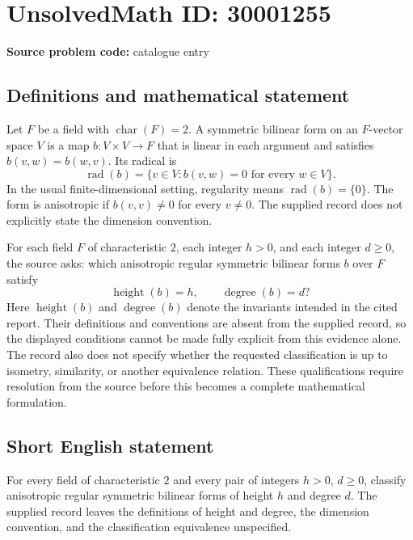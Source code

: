 \documentclass[11pt]{article}
\begin{document}
\section*{UnsolvedMath ID: 30001255}
\textbf{Source problem code:} catalogue entry
\subsection{Definitions and mathematical statement}
Let \(F\) be a field with \(\operatorname{char}(F)=2\). A symmetric bilinear form on an \(F\)-vector space \(V\) is a map \(b\colon V\times V\to F\) that is linear in each argument and satisfies \(b(v,w)=b(w,v)\). Its radical is
\[
\operatorname{rad}(b)=\{v\in V: b(v,w)=0\text{ for every }w\in V\}.
\]
In the usual finite-dimensional setting, regularity means \(\operatorname{rad}(b)=\{0\}\). The form is anisotropic if \(b(v,v)\ne 0\) for every \(v\ne 0\). The supplied record does not explicitly state the dimension convention.

For each field \(F\) of characteristic \(2\), each integer \(h>0\), and each integer \(d\geq 0\), the source asks: which anisotropic regular symmetric bilinear forms \(b\) over \(F\) satisfy
\[
\operatorname{height}(b)=h,
\qquad
\operatorname{degree}(b)=d?
\]
Here \(\operatorname{height}(b)\) and \(\operatorname{degree}(b)\) denote the invariants intended in the cited report. Their definitions and conventions are absent from the supplied record, so the displayed conditions cannot be made fully explicit from this evidence alone. The record also does not specify whether the requested classification is up to isometry, similarity, or another equivalence relation. These qualifications require resolution from the source before this becomes a complete mathematical formulation.
\subsection{Short English statement}
For every field of characteristic \(2\) and every pair of integers \(h>0\), \(d\geq 0\), classify anisotropic regular symmetric bilinear forms of height \(h\) and degree \(d\). The supplied record leaves the definitions of height and degree, the dimension convention, and the classification equivalence unspecified.
\end{document}
